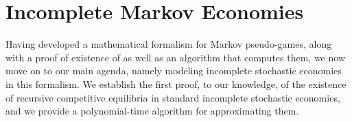 \section{Incomplete Markov Economies}
\label{sec:infinite}

Having developed a mathematical formalism for Markov pseudo-games, along with a proof of existence of \MPGNE{} as well as an algorithm that computes them, we now move on to our main agenda, namely modeling incomplete stochastic economies in this formalism.
We establish the first proof, to our knowledge, of the existence of recursive competitive equilibria in standard incomplete stochastic economies, and we provide a polynomial-time algorithm for approximating them.







